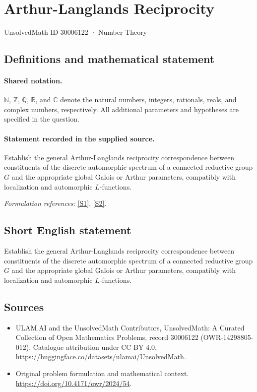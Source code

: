 \documentclass[11pt]{article}
\newcommand{\sref}[2]{\hyperlink{source:#1:#2}{[S#2]}}
\begin{document}
\setcounter{section}{30006121}
\section{Arthur-Langlands Reciprocity}\label{30006122}
{\small UnsolvedMath ID 30006122 · Number Theory}
\subsection{Definitions and mathematical statement}

\paragraph{Shared notation.}$\mathbb N$, $\mathbb Z$, $\mathbb Q$, $\mathbb R$, and $\mathbb C$ denote the natural numbers, integers, rationals, reals, and complex numbers, respectively. All additional parameters and hypotheses are specified in the question.


\paragraph{Statement recorded in the supplied source.}
Establish the general Arthur-Langlands reciprocity correspondence between constituents of the discrete automorphic spectrum of a connected reductive group $G$ and the appropriate global Galois or Arthur parameters, compatibly with localization and automorphic $L$-functions.
\par\smallskip\textit{Formulation references:} \sref{30006122}{1}, \sref{30006122}{2}.
\subsection{Short English statement}
Establish the general Arthur-Langlands reciprocity correspondence between constituents of the discrete automorphic spectrum of a connected reductive group $G$ and the appropriate global Galois or Arthur parameters, compatibly with localization and automorphic $L$-functions.
\subsection{Sources}
\begin{itemize}
\item[\hypertarget{source:30006122:1}{S1}] ULAM.AI and the UnsolvedMath Contributors, UnsolvedMath: A Curated Collection of Open Mathematics Problems, record 30006122 (OWR-14298805-012). Catalogue attribution under CC BY 4.0.
\url{https://huggingface.co/datasets/ulamai/UnsolvedMath}.
\item[\hypertarget{source:30006122:2}{S2}] Original problem formulation and mathematical context.
\url{https://doi.org/10.4171/owr/2024/54}.
\end{itemize}
\label{end:30006122}
\end{document}
